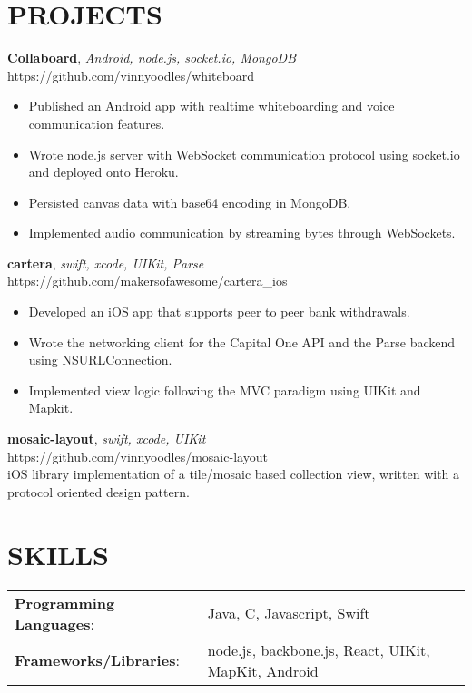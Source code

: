 \documentclass[line,margin]{res}
\begin{document}
\begin{resume}
	\section{PROJECTS}
    \textbf{Collaboard}, {\sl Android, node.js, socket.io, MongoDB}\\ https://github.com/vinnyoodles/whiteboard\\\begin{itemize} \itemsep 1pt
	\item Published an Android app with realtime whiteboarding and voice communication features.
	\item Wrote node.js server with WebSocket communication protocol using socket.io and deployed onto Heroku.
	\item Persisted canvas data with base64 encoding in MongoDB.
	\item Implemented audio communication by streaming bytes through WebSockets.
    \end{itemize}
	\textbf{cartera}, {\sl swift, xcode, UIKit, Parse}\\ https://github.com/makersofawesome/cartera\_ios\\\begin{itemize} \itemsep 1pt
	\item Developed an iOS app that supports peer to peer bank withdrawals.
	\item Wrote the networking client for the Capital One API and the Parse backend using NSURLConnection. 
	\item Implemented view logic following the MVC paradigm using UIKit and Mapkit.
	\end{itemize}
	\textbf{mosaic-layout}, {\sl swift, xcode, UIKit}\\ https://github.com/vinnyoodles/mosaic-layout\\iOS library implementation of a tile/mosaic based collection view, written with a protocol oriented design pattern.\\
	\section{SKILLS}
	\begin{tabular}{@{}ll}
		\textbf{Programming Languages}: & Java, C, Javascript, Swift   \\
		\textbf{Frameworks/Libraries}:  & node.js, backbone.js, React, UIKit, MapKit, Android  \\
	\end{tabular}
\end{resume}
\end{document}
